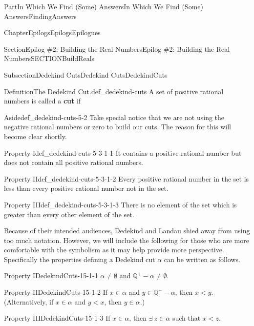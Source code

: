 \documentclass[oneside,10pt,]{book}
\newcommand{\terminology}[1]{\textbf{#1}}
\numberwithin{equation}{part}
\newcommand{\QQ}{\mathbb {Q}}
\newcommand{\lt}{<}
\begin{document}
\begin{partptx}{Part}{In Which We Find (Some) Answers}{}{In Which We Find (Some) Answers}{}{}{FindingAnswers}
\begin{chapterptx}{Chapter}{Epilogs}{}{Epilogs}{}{}{Epilogues}
\begin{sectionptx}{Section}{Epilog \#2: Building the Real Numbers}{}{Epilog \#2: Building the Real Numbers}{}{}{SECTIONBuildReals}
\begin{subsectionptx}{Subsection}{Dedekind Cuts}{}{Dedekind Cuts}{}{}{DedekindCuts}
\begin{definition}{Definition}{The Dedekind Cut.}{def_dedekind-cuts}
%
%
%
A set of positive rational numbers is called a \terminology{cut} if%
\begin{aside}{Aside}{}{def_dedekind-cuts-5-2}%
Take special notice that we are not using the negative rational numbers or zero to build our cuts.  The reason for this will become clear shortly.%
\end{aside}
%
\begin{descriptionlist}
\begin{dlimedium}{Property I}{def_dedekind-cuts-5-3-1-1}%
It contains a positive rational number but does not contain all positive rational numbers.%
\end{dlimedium}%
\begin{dlimedium}{Property II}{def_dedekind-cuts-5-3-1-2}%
Every positive rational number in the set is less than every positive rational number not in the set.%
\end{dlimedium}%
\begin{dlimedium}{Property III}{def_dedekind-cuts-5-3-1-3}%
There is no element of the set which is greater than every other element of the set.%
\end{dlimedium}%
\end{descriptionlist}
%
\end{definition}
 Because of their intended audiences, Dedekind and Landau shied away from using too much notation.  However, we will include the following for those who are more comfortable with the symbolism as it may help provide more perspective. Specifically the properties defining a Dedekind cut \(\alpha\) can be written as follows.%
\par
%
\begin{descriptionlist}
\begin{dlimedium}{Property I}{DedekindCuts-15-1-1}%
\(\alpha\ne\emptyset\) and \(\QQ^+-\alpha\ne\emptyset\).%
\end{dlimedium}%
\begin{dlimedium}{Property II}{DedekindCuts-15-1-2}%
If \(x\in\alpha\) and \(y\in\QQ^+-\alpha\), then \(x\lt y\). (Alternatively, if \(x\in\alpha\) and \(y\lt x\), then \(y\in\alpha\).)%
\end{dlimedium}%
\begin{dlimedium}{Property III}{DedekindCuts-15-1-3}%
If \(x\in\alpha\), then \(\exists\ z\in\alpha\) such that \(x\lt z\).%
\end{dlimedium}%
\end{descriptionlist}

\end{subsectionptx}
\end{sectionptx}
\end{chapterptx}
\end{partptx}
\end{document}
